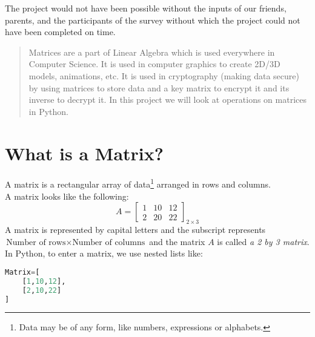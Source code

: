 The project would not have been possible without the inputs of our friends, parents, and the participants of the survey without which the project could not have been completed on time. 
\begin{abstract}
	Matrices are a part of Linear Algebra which is used everywhere in Computer Science. It is used in computer graphics to create 2D/3D models, animations, etc. It is used in cryptography (making data secure) by using matrices to store data and a key matrix to encrypt it and its inverse to decrypt it. In this project we will look at operations on matrices in Python.
\end{abstract}
\section{What is a Matrix?}
A matrix is a rectangular array of data\footnote{Data may be of any form, like numbers, expressions or alphabets.} arranged in rows and columns.\\
A matrix looks like the following:
\[A=\begin{bmatrix}
		1 & 10 & 12 \\
		2 & 20 & 22
	\end{bmatrix}_{2\times 3}\]
A matrix is represented by capital letters and the subscript represents $\text{Number of rows}\times \text{Number of columns}$ and the matrix $A$ is called \emph{a 2 by 3 matrix}.\\
In Python, to enter a matrix, we use nested lists like:
\begin{lstlisting}[language=Python, numbers=none]
Matrix=[
	[1,10,12],
	[2,10,22]
]\end{lstlisting}
